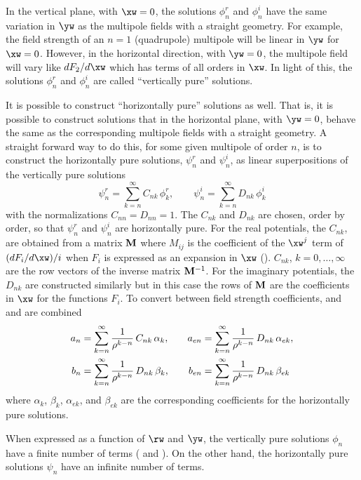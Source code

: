 In the vertical plane, with $\xw = 0$, the solutions $\phi_n^r$ and $\phi_n^i$ have the same
variation in $\yw$ as the multipole fields with a straight geometry. For example, the field
strength of an $n = 1$ (quadrupole) multipole will be linear in $\yw$ for $\xw = 0$. However, in the
horizontal direction, with $\yw = 0$, the multipole field will vary like $dF_2/d\xw$ which has
terms of all orders in $\xw$. In light of this, the solutions $\phi_n^r$ and $\phi_n^i$ are
called ``vertically pure'' solutions.

It is possible to construct ``horizontally pure'' solutions as well. That is, it is possible to
construct solutions that in the horizontal plane, with $\yw = 0$, behave the same as the corresponding
multipole fields with a straight geometry. A straight forward way to do this, for some given
multipole of order $n$, is to construct the horizontally pure solutions, $\psi_n^r$ and $\psi_n^i$,
as linear superpositions of the vertically pure solutions
\begin{equation}
  \psi_n^r = \sum_{k = n}^\infty C_{nk} \, \phi_k^r, \qquad
  \psi_n^i = \sum_{k = n}^\infty D_{nk} \, \phi_k^i
  \label{p1rc}
\end{equation}
with the normalizations $C_{nn} = D_{nn} = 1$. The $C_{nk}$ and $D_{nk}$ are chosen, order
by order, so that $\psi_n^r$ and $\psi_n^i$ are horizontally pure. For the real
potentials, the $C_{nk}$, are obtained from a matrix ${\bf M}$ where $M_{ij}$ is the
coefficient of the $\xw^j$ term of $(dF_i/d\xw)/i$ when $F_i$ is expressed as an expansion in
$\xw$ (). $C_{nk}$, $k = 0, \ldots, \infty$ are the row vectors of the inverse
matrix ${\bf M}^{-1}$. For the imaginary potentials, the $D_{nk}$ are constructed similarly
but in this case the rows of ${\bf M}$ are the coefficients in $\xw$ for the functions $F_i$.
To convert between field strength coefficients,  and  and 
are combined
\begin{alignat}{3}
  a_n &= \sum_{k = n}^\infty \frac{1}{\rho^{k-n}} \, C_{nk} \, \alpha_k, \quad 
  &a_{en} &= \sum_{k = n}^\infty \frac{1}{\rho^{k-n}} \, D_{nk} \, \alpha_{ek}, \nonumber \\
  b_n &= \sum_{k = n}^\infty \frac{1}{\rho^{k-n}} \, D_{nk} \, \beta_k, \quad
  &b_{en} &= \sum_{k = n}^\infty \frac{1}{\rho^{k-n}} \, D_{nk} \, \beta_{ek}
\end{alignat}
where $\alpha_k$, $\beta_k$, $\alpha_{ek}$, and $\beta_{ek}$ are the corresponding coefficients
for the horizontally pure solutions.

When expressed as a function of $\rw$ and $\yw$, the vertically pure solutions $\phi_n$ have a
finite number of terms ( and ). On the other hand, the horizontally
pure solutions $\psi_n$ have an infinite number of terms.

